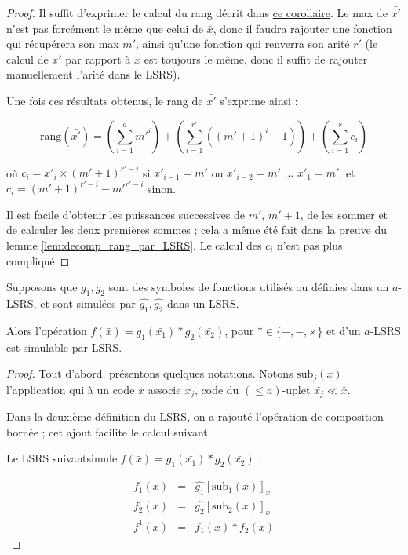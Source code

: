 \documentclass{report}
\newcommand{\leqa}{\left( \leqslant a \right)}
\begin{document}
	\begin{proof}
		Il suffit d'exprimer le calcul du rang décrit dans \hyperref[coro:rang_bon_ordre]{ce corollaire}. Le max de $\bar{x'}$ n'est pas forcément le même que celui de $\bar{x}$, donc il faudra rajouter une fonction qui récupérera son max $m'$, ainsi qu'une fonction qui renverra son arité $r'$ (le calcul de $\bar{x'}$ par rapport à $\bar{x}$ est toujours le même, donc il suffit de rajouter manuellement l'arité dans le LSRS). 
		
		Une fois ces résultats obtenus, le rang de $\bar{x'}$ s'exprime ainsi :
		
		\begin{equation}
			\text{rang}\left(\bar{x'}\right) = \left( \sum_{i=1}^{a} m'^i \right) + \left( \sum_{i=1}^{r'} \left( \left(m'+1\right)^i -1 \right) \right) + \left(\sum_{i=1}^{r} c_i \right)
		\end{equation}
		
		où $c_i = x'_i \times \left(m'+1\right)^{r'-i}$ si $x'_{i-1} = m'$ ou $x'_{i-2} = m'$ $\dots$ $x'_{1} = m'$, et $c_i = \left(m'+1\right)^{r'-i}-m'^{r'-i}$ sinon.
		
		Il est facile d'obtenir les puissances successives de $m'$, $m'+1$, de les sommer et de calculer les deux premières sommes ; cela a même été fait dans la preuve du lemme \ref{lem:decomp_rang_par_LSRS}. Le calcul des $c_i$ n'est pas plus compliqué 
	\end{proof}
	
	
	\begin{lemma}
		\label{lem:operation_simulable}
		Supposons que $g_1, g_2$ sont des symboles de fonctions utilisés ou définies dans un $a$-LSRS, et sont simulées par $\hat{g_1},\hat{g_2}$ dans un LSRS.
		
		Alors l'opération $f\left(\bar{x}\right) = g_1\left(\bar{x_1}\right) * g_2\left(\bar{x_2}\right)$, pour $* \in \{+, -, \times \}$ et d'un $a$-LSRS est simulable par LSRS.
	\end{lemma}
	
	\begin{proof}
		Tout d'abord, présentons quelques notations. Notons $\text{sub}_j(x)$ l'application qui à un code $x$ associe $x_j$, code du $\leqa$-uplet $\bar{x_j} \ll \bar{x}$. 
		
		Dans la \hyperref[def:LSRS_2]{deuxième définition du LSRS}, on a rajouté l'opération de composition bornée ; cet ajout facilite le calcul suivant. 
		
		Le LSRS suivant\footnotemark  simule $f\left(\bar{x}\right) = g_1\left(\bar{x_1}\right) * g_2\left(\bar{x_2}\right)$ :
			
		
		\begin{eqnarray}
			f_1(x) & = & \hat{g_1}\left[ \text{sub}_1(x) \right]_x \\
			f_2(x) & = & \hat{g_2}\left[ \text{sub}_2(x) \right]_x \\
			f^1(x) & = & f_1(x) * f_2(x) 
		\end{eqnarray}
	\end{proof}
	
\end{document}
